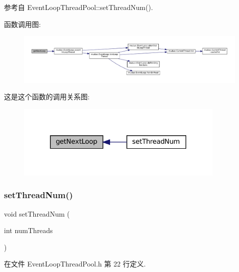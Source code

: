 参考自 Event\+Loop\+Thread\+Pool\+::set\+Thread\+Num().

函数调用图\+:
\nopagebreak
\begin{figure}[H]
\begin{center}
\leavevmode
\includegraphics[width=350pt]{classmuduo_1_1EventLoopThreadPool_ad79a4dd0cdd1358bfde1170759543c7d_cgraph}
\end{center}
\end{figure}
这是这个函数的调用关系图\+:
\nopagebreak
\begin{figure}[H]
\begin{center}
\leavevmode
\includegraphics[width=284pt]{classmuduo_1_1EventLoopThreadPool_ad79a4dd0cdd1358bfde1170759543c7d_icgraph}
\end{center}
\end{figure}
\mbox{\label{classmuduo_1_1EventLoopThreadPool_a83bb28d139df96ba9fc449b4643f2c36}} 
\subsubsection{\texorpdfstring{set\+Thread\+Num()}{setThreadNum()}}
{\footnotesize\ttfamily void set\+Thread\+Num (\begin{DoxyParamCaption}\item[{int}]{num\+Threads }\end{DoxyParamCaption})\hspace{0.3cm}{\ttfamily [inline]}}



在文件 Event\+Loop\+Thread\+Pool.\+h 第 22 行定义.



